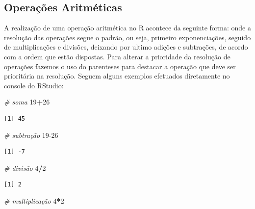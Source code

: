 \documentclass[12pt,brazil,]{book}
\newenvironment{Shaded}{\begin{snugshade}}{\end{snugshade}}
\newcommand{\CommentTok}[1]{\textcolor[rgb]{0.56,0.35,0.01}{\textit{#1}}}
\newcommand{\DecValTok}[1]{\textcolor[rgb]{0.00,0.00,0.81}{#1}}
\newcommand{\OperatorTok}[1]{\textcolor[rgb]{0.81,0.36,0.00}{\textbf{#1}}}
\begin{document}
\hypertarget{operacoes-aritmeticas}{%
\subsection{Operações Aritméticas}\label{operacoes-aritmeticas}}

A realização de uma operação aritmética no R acontece da seguinte forma:
onde a resolução das operações segue o padrão, ou seja, primeiro
exponenciações, seguido de multiplicações e divisões, deixando por
ultimo adições e subtrações, de acordo com a ordem que estão dispostas.
Para alterar a prioridade da resolução de operações fazemos o uso do
parenteses para destacar a operação que deve ser prioritária na
resolução. Seguem alguns exemplos efetuados diretamente no console do
RStudio:

\begin{Shaded}
\begin{Highlighting}[]
\CommentTok{# soma}
\DecValTok{19}\OperatorTok{+}\DecValTok{26}
\end{Highlighting}
\end{Shaded}

\begin{verbatim}
[1] 45
\end{verbatim}

\begin{Shaded}
\begin{Highlighting}[]
\CommentTok{# subtração}
\DecValTok{19-26}
\end{Highlighting}
\end{Shaded}

\begin{verbatim}
[1] -7
\end{verbatim}

\begin{Shaded}
\begin{Highlighting}[]
\CommentTok{# divisão}
\DecValTok{4}\OperatorTok{/}\DecValTok{2}
\end{Highlighting}
\end{Shaded}

\begin{verbatim}
[1] 2
\end{verbatim}

\begin{Shaded}
\begin{Highlighting}[]
\CommentTok{# multiplicação }
\DecValTok{4}\OperatorTok{*}\DecValTok{2}
\end{Highlighting}
\end{Shaded}
\end{document}
